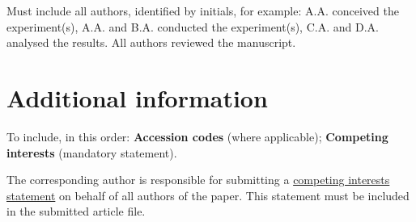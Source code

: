 \documentclass[fleqn,10pt]{wlscirep}
\begin{document}
Must include all authors, identified by initials, for example:
A.A. conceived the experiment(s),  A.A. and B.A. conducted the experiment(s), C.A. and D.A. analysed the results.  All authors reviewed the manuscript. 

\section*{Additional information}

To include, in this order: \textbf{Accession codes} (where applicable); \textbf{Competing interests} (mandatory statement). 

The corresponding author is responsible for submitting a \href{http://www.nature.com/srep/policies/index.html#competing}{competing interests statement} on behalf of all authors of the paper. This statement must be included in the submitted article file.


\end{document}
